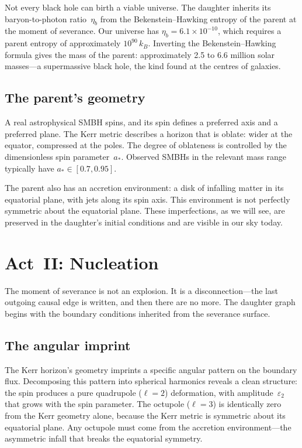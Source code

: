 \documentclass[11pt,a4paper]{article}
\theoremstyle{plain}
\theoremstyle{definition}
\theoremstyle{remark}
\begin{document}
Not every black hole can birth a viable universe.  The daughter inherits
its baryon-to-photon ratio~$\eta_b$ from the Bekenstein--Hawking entropy
of the parent at the moment of severance.  Our universe has
$\eta_b = 6.1 \times 10^{-10}$, which requires a parent entropy of
approximately $10^{90}\,k_B$.  Inverting the Bekenstein--Hawking formula
gives the mass of the parent: approximately 2.5 to 6.6 million solar
masses---a supermassive black hole, the kind found at the centres of
galaxies.

\subsection{The parent's geometry}\label{sec:kerr}

A real astrophysical SMBH spins, and its spin defines a preferred axis and
a preferred plane.  The Kerr metric describes a horizon that is oblate:
wider at the equator, compressed at the poles.  The degree of oblateness
is controlled by the dimensionless spin parameter~$a_*$.  Observed SMBHs
in the relevant mass range typically have $a_* \in [0.7, 0.95]$.

The parent also has an accretion environment: a disk of infalling matter
in its equatorial plane, with jets along its spin axis.  This environment
is not perfectly symmetric about the equatorial plane.  These
imperfections, as we will see, are preserved in the daughter's initial
conditions and are visible in our sky today.

\section{Act~II: Nucleation}\label{sec:act2}

The moment of severance is not an explosion.  It is a
disconnection---the last outgoing causal edge is written, and then there
are no more.  The daughter graph begins with the boundary conditions
inherited from the severance surface.

\subsection{The angular imprint}\label{sec:imprint}

The Kerr horizon's geometry imprints a specific angular pattern on the
boundary flux.  Decomposing this pattern into spherical harmonics reveals
a clean structure: the spin produces a pure quadrupole ($\ell = 2$)
deformation, with amplitude~$\varepsilon_2$ that grows with the spin
parameter.  The octupole ($\ell = 3$) is identically zero from the Kerr
geometry alone, because the Kerr metric is symmetric about its equatorial
plane.  Any octupole must come from the accretion environment---the
asymmetric infall that breaks the equatorial symmetry.
\end{document}
